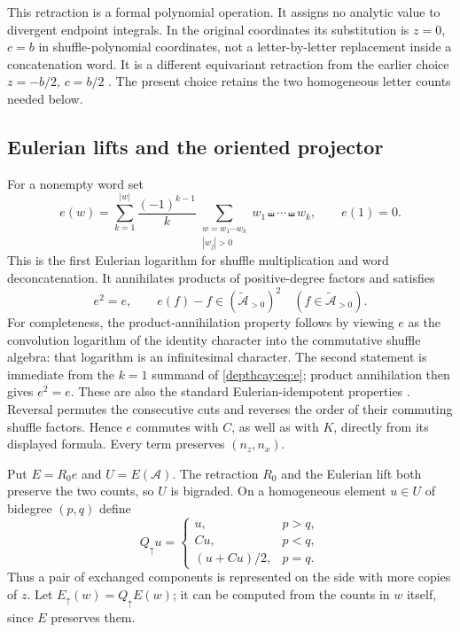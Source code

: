 This retraction is a formal polynomial operation. It assigns no analytic
value to divergent endpoint integrals. In the original coordinates its
substitution is $z=0$, $c=b$ in shuffle-polynomial coordinates, not a
letter-by-letter replacement inside a concatenation word. It is a
different equivariant retraction from the earlier choice
$z=-b/2$, $c=b/2$ \cite{depth:PriorProjection}. The present choice retains
the two homogeneous letter counts needed below.

\subsection{Eulerian lifts and the oriented projector}

For a nonempty word set
\begin{equation}\label{depthcay:eq:e}
 e(w)=\sum_{k=1}^{|w|}\frac{(-1)^{k-1}}{k}
 \sum_{\substack{w=w_1\cdots w_k\\|w_j|>0}}
 w_1\shuffle\cdots\shuffle w_k,
 \qquad e(1)=0.
\end{equation}
This is the first Eulerian logarithm for shuffle multiplication and
word deconcatenation. It annihilates products of positive-degree
factors and satisfies
\begin{equation}\label{depthcay:eq:e-properties}
 e^2=e,\qquad e(f)-f\in
 (\widetilde{\mathcal A}_{>0})^2
 \quad(f\in\widetilde{\mathcal A}_{>0}).
\end{equation}
For completeness, the product-annihilation property follows by viewing
$e$ as the convolution logarithm of the identity character into the
commutative shuffle algebra: that logarithm is an infinitesimal
character. The second statement is immediate from the $k=1$ summand
of \eqref{depthcay:eq:e}; product annihilation then gives $e^2=e$.
These are also the standard Eulerian-idempotent properties
\cite{depth:Patras}. Reversal permutes the consecutive cuts and reverses
the order of their commuting shuffle factors. Hence $e$ commutes with
$C$, as well as with $K$, directly from its displayed formula.
Every term preserves $(n_z,n_x)$.

Put $E=R_0e$ and $U=E(\mathcal A)$. The retraction $R_0$ and the
Eulerian lift both preserve the two counts, so $U$ is bigraded.
On a homogeneous element $u\in U$ of bidegree $(p,q)$ define
\begin{equation}\label{depthcay:eq:orientation}
 Q_{\uparrow}u=
 \begin{cases}
 u,&p>q,\\
 Cu,&p<q,\\
 (u+Cu)/2,&p=q.
 \end{cases}
\end{equation}
Thus a pair of exchanged components is represented on the side with
more copies of $z$. Let $E_{\uparrow}(w)=Q_{\uparrow}E(w)$; it can be
computed from the counts in $w$ itself, since $E$ preserves them.

